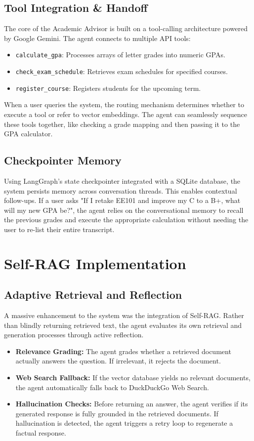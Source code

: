 \documentclass[12pt, a4paper]{report}
\begin{document}
\section{Tool Integration \& Handoff}
The core of the Academic Advisor is built on a tool-calling architecture powered by Google Gemini. The agent connects to multiple API tools:
\begin{itemize}
    \item \texttt{calculate\_gpa}: Processes arrays of letter grades into numeric GPAs.
    \item \texttt{check\_exam\_schedule}: Retrieves exam schedules for specified courses.
    \item \texttt{register\_course}: Registers students for the upcoming term.
\end{itemize}
When a user queries the system, the routing mechanism determines whether to execute a tool or refer to vector embeddings. The agent can seamlessly sequence these tools together, like checking a grade mapping and then passing it to the GPA calculator.

\section{Checkpointer Memory}
Using LangGraph's state checkpointer integrated with a SQLite database, the system persists memory across conversation threads. This enables contextual follow-ups. If a user asks "If I retake EE101 and improve my C to a B+, what will my new GPA be?", the agent relies on the conversational memory to recall the previous grades and execute the appropriate calculation without needing the user to re-list their entire transcript.

\chapter{Self-RAG Implementation}
\section{Adaptive Retrieval and Reflection}
A massive enhancement to the system was the integration of Self-RAG. Rather than blindly returning retrieved text, the agent evaluates its own retrieval and generation processes through active reflection.
\begin{itemize}
    \item \textbf{Relevance Grading:} The agent grades whether a retrieved document actually answers the question. If irrelevant, it rejects the document.
    \item \textbf{Web Search Fallback:} If the vector database yields no relevant documents, the agent automatically falls back to DuckDuckGo Web Search.
    \item \textbf{Hallucination Checks:} Before returning an answer, the agent verifies if its generated response is fully grounded in the retrieved documents. If hallucination is detected, the agent triggers a retry loop to regenerate a factual response.
\end{itemize}
\end{document}
